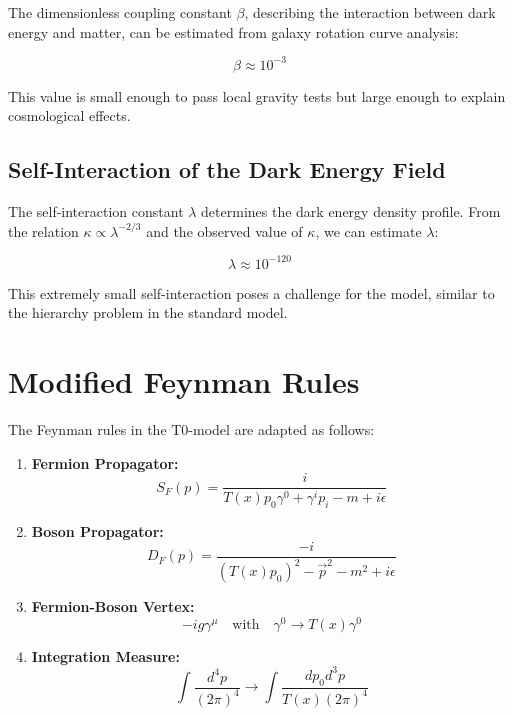 \documentclass[a4paper,12pt]{article}
\theoremstyle{definition}
\theoremstyle{remark}
\newcommand{\Tfield}{T(x)} %
\begin{document}
	The dimensionless coupling constant \(\beta\), describing the interaction between dark energy and matter, can be estimated from galaxy rotation curve analysis:
	
	\begin{equation}
		\beta \approx 10^{-3}
	\end{equation}
	
	This value is small enough to pass local gravity tests but large enough to explain cosmological effects.
	
	\subsection{Self-Interaction of the Dark Energy Field}
	
	The self-interaction constant \(\lambda\) determines the dark energy density profile. From the relation \(\kappa \propto \lambda^{-2/3}\) and the observed value of \(\kappa\), we can estimate \(\lambda\):
	
	\begin{equation}
		\lambda \approx 10^{-120}
	\end{equation}
	
	This extremely small self-interaction poses a challenge for the model, similar to the hierarchy problem in the standard model.
	
	\section{Modified Feynman Rules}
	
	The Feynman rules in the T0-model are adapted as follows:
	
	\begin{enumerate}
		\item \textbf{Fermion Propagator:}
		\begin{equation}
			S_F(p) = \frac{i}{\Tfield p_0 \gamma^0 + \gamma^i p_i - m + i\epsilon}
		\end{equation}
		
		\item \textbf{Boson Propagator:}
		\begin{equation}
			D_F(p) = \frac{-i}{(\Tfield p_0)^2 - \vec{p}^2 - m^2 + i\epsilon}
		\end{equation}
		
		\item \textbf{Fermion-Boson Vertex:}
		\begin{equation}
			-ig\gamma^\mu \quad \text{with} \quad \gamma^0 \rightarrow \Tfield \gamma^0
		\end{equation}
		
		\item \textbf{Integration Measure:}
		\begin{equation}
			\int \frac{d^4p}{(2\pi)^4} \rightarrow \int \frac{dp_0 d^3p}{\Tfield (2\pi)^4}
		\end{equation}
	\end{enumerate}
	
\end{document}

